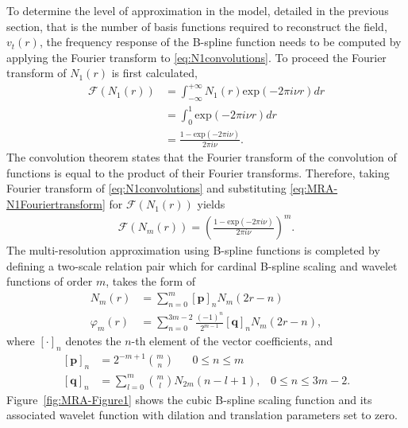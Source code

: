 \documentclass[11pt,draftcls,onecolumn,peerreview]{IEEEtran}
\begin{document}
To determine the level of approximation in the model, detailed in the previous section, that is the number of basis functions required to reconstruct the field, $v_t(r)$, the frequency response of the B-spline function needs to be computed by applying the Fourier transform to \eqref{eq:N1convolutions}. To proceed the Fourier transform of $N_1(r)$ is first calculated, 
\begin{align}\label{eq:MRA-N1Fouriertransform}
\mathcal F(N_1(r))&=\int_{-\infty}^{+\infty}N_1(r)\mathrm{exp}(-2\pi i \nu r)dr \nonumber \\
&=\int_{0}^{1} \mathrm{exp}(-2\pi i \nu r)dr \nonumber \\
&=\frac{1-\mathrm{exp}(-2\pi i \nu)}{2\pi i\nu}.
\end{align}
The convolution theorem states that the Fourier transform of the convolution of functions is equal to the product of their Fourier transforms. Therefore, taking Fourier transform of \eqref{eq:N1convolutions} and substituting \eqref{eq:MRA-N1Fouriertransform} for $\mathcal F(N_1(r)) $ yields
\begin{align}\label{eq:MRA-NmFouriertransform}
\mathcal F(N_m(r))=\left(\frac{1-\mathrm{exp}(-2\pi i \nu)}{2\pi i\nu}\right)^m.
\end{align}
The multi-resolution approximation using B-spline functions is completed by defining a two-scale relation pair which for cardinal B-spline scaling and wavelet functions of order $m$, takes the form of \cite{Chui1992}
\begin{align}
 N_{m}\left(r\right)&=\sum_{n=0}^{m} \left[\mathbf p\right]_n N_{m}\left(2r-n\right) \label{eq:MRA-TwoScalepair1} \\
  \varphi_{m}\left(r\right) &= \sum_{n=0}^{3m-2} \frac{\left(-1\right)^n}{2^{m-1}} \left[\mathbf q\right]_n N_{m}\left(2r-n\right)\label{eq:MRA-TwoScalepair2},
 \end{align}
 where $\left[\cdot\right]_n$ denotes the $n$-th element of the vector coefficients, and
 \begin{align}
\left[\mathbf p\right]_n&=2^{-m+1} \binom{m}{n} \quad \text{ $0\le n\le m$} \label{eq:MRA-TwoScalepair1coefs}\\
\left[\mathbf q\right]_n&= \sum_{l=0}^{m} \binom{m}{l} N_{2m}\left(n-l+1\right), \,  \text{ $0\le n\le 3m-2$}\label{eq:MRA-TwoScalepair2coefs}.
 \end{align}
 Figure~\ref{fig:MRA-Figure1} shows the cubic B-spline scaling function and its associated wavelet function with dilation and translation parameters set to zero. 
\end{document}
